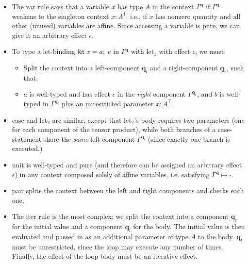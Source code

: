 \documentclass[acmsmall,screen,anonymous,review]{acmart}
\newcommand{\mb}[1]{\ensuremath{\mathbf{#1}}}
\newcommand{\ms}[1]{\ensuremath{\mathsf{#1}}}
\newcommand{\letexpr}[3]{\ensuremath{\ms{let}\;#1 = #2;\;#3}}
\newcommand{\cwk}[2]{#1 \mapsto #2}
\newcommand{\brle}[1]{{\textsf{#1}}}
\newcommand{\oneq}{1}
\begin{document}
\begin{itemize}
  \item The \brle{var} rule says that a variable $x$ has type $A$ in
  the context $\Gamma^{\mb{q}}$ if $\Gamma^{\mb{q}}$ weakens to the singleton context $x: A^\oneq$,
  i.e., if $x$ has nonzero quantity and all other (unused) variables are affine. Since accessing a
  variable is pure, we can give it an arbitrary effect
  $\epsilon$. 
  \item To type a let-binding $\letexpr{x}{a}{e}$ in $\Gamma^{\mb{q}}$ with \brle{let$_1$} with
  effect $\epsilon$, we must:
  \begin{itemize}
    \item Split the context into a left-component $\mb{q}_l$ and a right-component
    $\mb{q}_r$, such that:
    \item $a$ is well-typed and has effect $\epsilon$ in the \emph{right} component
    $\Gamma^{\mb{q}_r}$, and $b$ is well-typed in $\Gamma^{\mb{q}_l}$ plus an unrestricted parameter $x: A^\top$.
  \end{itemize}
  \item \brle{case} and \brle{let$_2$} are similar, except that \brle{let$_2$}'s body requires two
  parameters (one for each component of the tensor product), while both branches of a case-statement
  share the \emph{same} left-component $\Gamma^{\mb{q}_l}$ (since exactly one branch is executed.)
  \item \brle{unit} is well-typed and pure (and therefore can be assigned an arbitrary effect
  $\epsilon$) in any context composed solely of affine variables, i.e. satisfying
  $\cwk{\Gamma^{\mb{q}}}{\cdot}$.
  \item \brle{pair} splits the context between
  the left and right components and checks each one,
  \item The \brle{iter} rule is the most complex: we split the context into a
  component $\mb{q}_r$ for the initial value and a component $\mb{q}_l$ for the body. The initial
  value is then evaluated and passed in as an additional parameter of type $A$ to the body. 
  $\mb{q}_l$ must be unrestricted, since the loop may execute any number of
  times. Finally, the effect of the loop body must be an iterative effect.
\end{itemize}
\end{document}

